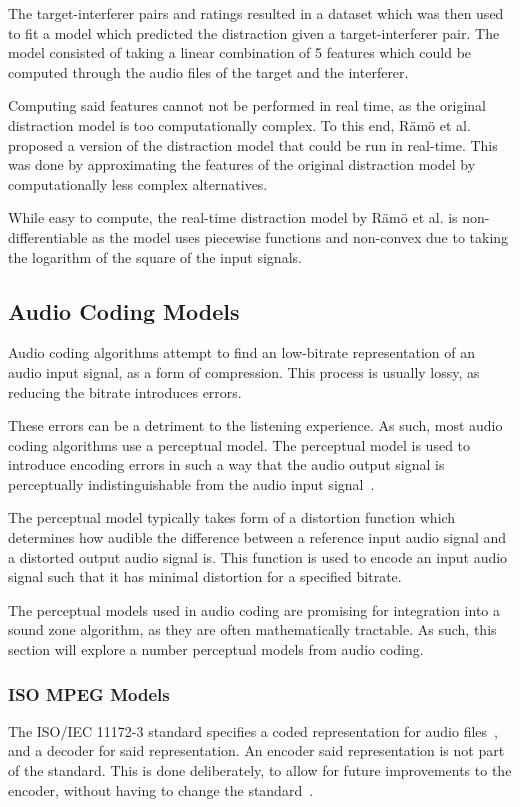 The target-interferer pairs and ratings resulted in a dataset which was then used to fit a model which predicted the
distraction given a target-interferer pair.
The model consisted of taking a linear combination of 5 features which could be computed through the audio files of the 
target and the interferer.

Computing said features cannot not be performed in real time, as the original distraction model is too computationally
complex.
To this end, R\"am\"o et al. proposed a version of the distraction model that could be run in real-time.
This was done by approximating the features of the original distraction model by computationally less complex alternatives.

While easy to compute, the real-time distraction model by R\"am\"o et al. is non-differentiable as the model uses
piecewise functions and non-convex due to taking the logarithm of the square of the input signals. 


\subsection{Audio Coding Models}
\label{ch:perceptual:review:audio_coding}
Audio coding algorithms attempt to find an low-bitrate representation of an audio input signal, as a form of compression.
This process is usually lossy, as reducing the bitrate introduces errors.

These errors can be a detriment to the listening experience.
As such, most audio coding algorithms use a perceptual model.
The perceptual model is used to introduce encoding errors in such a way that the audio output
signal is perceptually indistinguishable from the audio input signal~\cite{taal2012low}.

The perceptual model typically takes form of a distortion function which determines how
audible the difference between a reference input audio signal and a distorted output audio signal is.
This function is used to encode an input audio signal such that it has minimal distortion for a
specified bitrate.

The perceptual models used in audio coding are promising for integration into a sound zone algorithm, as they are 
often mathematically tractable.
As such, this section will explore a number perceptual models from audio coding.

\subsubsection{ISO MPEG Models}
The ISO/IEC 11172-3 standard specifies a coded representation for audio files~\cite{ISO11172-3}, 
and a decoder for said representation.
An encoder said representation is not part of the standard.
This is done deliberately, to allow for future improvements to the encoder, without having to change the standard~\cite{pan1995tutorial}.

